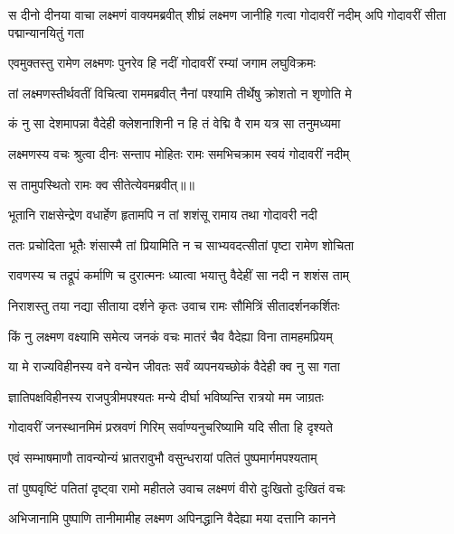 \threelineshloka
{स दीनो दीनया वाचा लक्ष्मणं वाक्यमब्रवीत्}
{शीघ्रं लक्ष्मण जानीहि गत्वा गोदावरीं नदीम्}
{अपि गोदावरीं सीता पद्मान्यानयितुं गता} %

\twolineshloka
{एवमुक्तस्तु रामेण लक्ष्मणः पुनरेव हि}
{नदीं गोदावरीं रम्यां जगाम लघुविक्रमः} %

\twolineshloka
{तां लक्ष्मणस्तीर्थवतीं विचित्वा राममब्रवीत्}
{नैनां पश्यामि तीर्थेषु क्रोशतो न शृणोति मे} %

\twolineshloka
{कं नु सा देशमापन्ना वैदेही क्लेशनाशिनी}
{न हि तं वेद्मि वै राम यत्र सा तनुमध्यमा} %

\twolineshloka
{लक्ष्मणस्य वचः श्रुत्वा दीनः सन्ताप मोहितः}
{रामः समभिचक्राम स्वयं गोदावरीं नदीम्} %

{स तामुपस्थितो रामः क्व सीतेत्येवमब्रवीत्॥॥} %

\addtocounter{shlokacount}{1}

\twolineshloka
{भूतानि राक्षसेन्द्रेण वधार्हेण हृतामपि}
{न तां शशंसू रामाय तथा गोदावरी नदी} %

\twolineshloka
{ततः प्रचोदिता भूतैः शंसास्मै तां प्रियामिति}
{न च साभ्यवदत्सीतां पृष्टा रामेण शोचिता} %

\twolineshloka
{रावणस्य च तद्रूपं कर्माणि च दुरात्मनः}
{ध्यात्वा भयात्तु वैदेहीं सा नदी न शशंस ताम्} %

\twolineshloka
{निराशस्तु तया नद्या सीताया दर्शने कृतः}
{उवाच रामः सौमित्रिं सीतादर्शनकर्शितः} %

\twolineshloka
{किं नु लक्ष्मण वक्ष्यामि समेत्य जनकं वचः}
{मातरं चैव वैदेह्या विना तामहमप्रियम्} %

\twolineshloka
{या मे राज्यविहीनस्य वने वन्येन जीवतः}
{सर्वं व्यपनयच्छोकं वैदेही क्व नु सा गता} %

\twolineshloka
{ज्ञातिपक्षविहीनस्य राजपुत्रीमपश्यतः}
{मन्ये दीर्घा भविष्यन्ति रात्रयो मम जाग्रतः} %

\twolineshloka
{गोदावरीं जनस्थानमिमं प्रस्रवणं गिरिम्}
{सर्वाण्यनुचरिष्यामि यदि सीता हि दृश्यते} %

\twolineshloka
{एवं सम्भाषमाणौ तावन्योन्यं भ्रातरावुभौ}
{वसुन्धरायां पतितं पुष्पमार्गमपश्यताम्} %

\twolineshloka
{तां पुष्पवृष्टिं पतितां दृष्ट्वा रामो महीतले}
{उवाच लक्ष्मणं वीरो दुःखितो दुःखितं वचः} %

\twolineshloka
{अभिजानामि पुष्पाणि तानीमामीह लक्ष्मण}
{अपिनद्धानि वैदेह्या मया दत्तानि कानने} %

